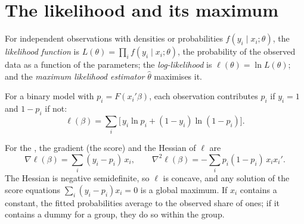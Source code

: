 \begin{omfigure}
\par{}
\end{omfigure}

\section{The likelihood and its maximum}\label{sec:b3:binary-outcomes:likelihood}

\begin{definition}\label{def:b3:binary-outcomes:mle}
For independent observations with densities or probabilities $f(y_i \mid x_i;
\theta)$, the \emph{likelihood function} is $L(\theta) = \prod_i f(y_i \mid x_i;
\theta)$, the probability of the observed data as a function of the
parameters; the \emph{log-likelihood} is $\ell(\theta) = \ln L(\theta)$; and the
\emph{maximum likelihood estimator} $\hat\theta$ maximises it.
\end{definition}

For a binary model with $p_i = F(x_i'\beta)$, each observation contributes $p_i$
if $y_i = 1$ and $1 - p_i$ if not:
\begin{equation}\label{eq:b3:bo:loglik}
  \ell(\beta) = \sum_i \bigl[\, y_i \ln p_i + (1 - y_i) \ln(1 - p_i) \bigr].
\end{equation}

\begin{proposition}\label{prop:b3:binary-outcomes:concave}
For the , the gradient (the score) and the Hessian of $\ell$ are
\[
  \nabla \ell(\beta) = \sum_i (y_i - p_i)\, x_i, \qquad
  \nabla^2 \ell(\beta) = -\sum_i p_i (1 - p_i)\, x_i x_i'.
\]
The Hessian is negative semidefinite, so $\ell$ is concave, and any solution of
the score equations $\sum_i (y_i - p_i) x_i = 0$ is a global maximum. If $x_i$
contains a constant, the fitted probabilities average to the observed share of
ones; if it contains a dummy for a group, they do so within the group.
\end{proposition}

